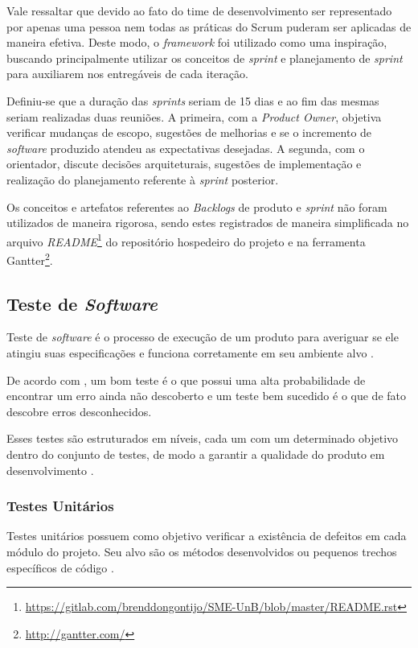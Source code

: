     Vale ressaltar que devido ao fato do time de desenvolvimento ser representado por apenas uma pessoa nem todas as práticas do Scrum puderam ser aplicadas de maneira efetiva. Deste modo, o \textit{framework} foi utilizado como uma inspiração, buscando principalmente utilizar
    os conceitos de \textit{sprint} e planejamento de \textit{sprint} para auxiliarem nos entregáveis de cada iteração.

    Definiu-se que a duração das \textit{sprints} seriam de 15 dias e ao fim das mesmas seriam realizadas duas reuniões. A primeira, com a \textit{Product Owner}, objetiva verificar mudanças de escopo, sugestões de melhorias e se o incremento de \textit{software} produzido atendeu as expectativas desejadas. A segunda,
    com o orientador, discute decisões arquiteturais, sugestões de implementação e realização
    do planejamento referente à \textit{sprint} posterior.

    Os conceitos e artefatos referentes ao \textit{Backlogs} de produto e \textit{sprint} não foram utilizados de maneira rigorosa, sendo estes registrados de maneira simplificada no arquivo \textit{README}\footnote{\url{https://gitlab.com/brenddongontijo/SME-UnB/blob/master/README.rst}} do repositório hospedeiro do projeto e na ferramenta Gantter\footnote{\url{http://gantter.com/}}.

    \subsection{Teste de \textit{Software}}
    Teste de \textit{software} é o processo de execução de um produto para averiguar se ele atingiu suas especificações e funciona corretamente em seu ambiente alvo \cite{artigo_intro_teste}.

    De acordo com , um bom teste é o que possui uma alta probabilidade de encontrar um erro ainda não descoberto e um teste bem sucedido é o que de fato descobre erros desconhecidos.

    Esses testes são estruturados em níveis, cada um com um determinado objetivo dentro do conjunto de testes, de modo a garantir a qualidade do produto em desenvolvimento \cite{sw_test_tech}.

        \subsubsection{Testes Unitários}
        Testes unitários possuem como objetivo verificar a existência de defeitos em cada módulo do projeto. Seu alvo são os métodos desenvolvidos ou pequenos trechos específicos de código \cite{artigo_intro_teste}.

